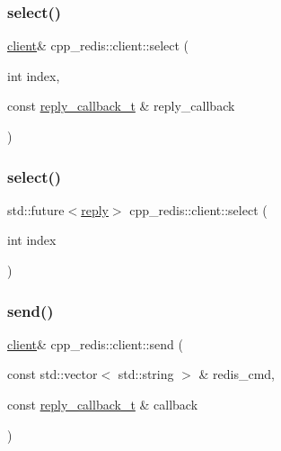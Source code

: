 \mbox{\label{classcpp__redis_1_1client_aee37b9bd265b8db614b4d7dcfdbaa422}} 
\subsubsection{\texorpdfstring{select()}{select()}\hspace{0.1cm}{\footnotesize\ttfamily [1/2]}}
{\footnotesize\ttfamily \hyperlink{classcpp__redis_1_1client}{client}\& cpp\+\_\+redis\+::client\+::select (\begin{DoxyParamCaption}\item[{int}]{index,  }\item[{const \hyperlink{classcpp__redis_1_1client_a061a1140d36d2eaeda82b09a0bb3f9f2}{reply\+\_\+callback\+\_\+t} \&}]{reply\+\_\+callback }\end{DoxyParamCaption})}

\mbox{\label{classcpp__redis_1_1client_a5eae97b05129d0571c3b871e1a786434}} 
\subsubsection{\texorpdfstring{select()}{select()}\hspace{0.1cm}{\footnotesize\ttfamily [2/2]}}
{\footnotesize\ttfamily std\+::future$<$\hyperlink{classcpp__redis_1_1reply}{reply}$>$ cpp\+\_\+redis\+::client\+::select (\begin{DoxyParamCaption}\item[{int}]{index }\end{DoxyParamCaption})}

\mbox{\label{classcpp__redis_1_1client_a490ef812b666e6d845fcacc808b87bc1}} 
\subsubsection{\texorpdfstring{send()}{send()}\hspace{0.1cm}{\footnotesize\ttfamily [1/2]}}
{\footnotesize\ttfamily \hyperlink{classcpp__redis_1_1client}{client}\& cpp\+\_\+redis\+::client\+::send (\begin{DoxyParamCaption}\item[{const std\+::vector$<$ std\+::string $>$ \&}]{redis\+\_\+cmd,  }\item[{const \hyperlink{classcpp__redis_1_1client_a061a1140d36d2eaeda82b09a0bb3f9f2}{reply\+\_\+callback\+\_\+t} \&}]{callback }\end{DoxyParamCaption})}

